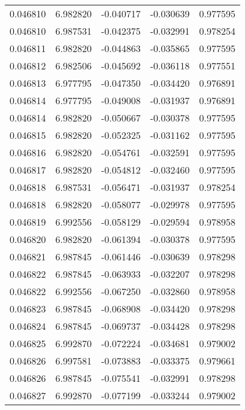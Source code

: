 \begin{tabular}{lrrrr}
0.046810    &  6.982820 & -0.040717 & -0.030639 &             0.977595 \\
0.046810    &  6.987531 & -0.042375 & -0.032991 &             0.978254 \\
0.046811    &  6.982820 & -0.044863 & -0.035865 &             0.977595 \\
0.046812    &  6.982506 & -0.045692 & -0.036118 &             0.977551 \\
0.046813    &  6.977795 & -0.047350 & -0.034420 &             0.976891 \\
0.046814    &  6.977795 & -0.049008 & -0.031937 &             0.976891 \\
0.046814    &  6.982820 & -0.050667 & -0.030378 &             0.977595 \\
0.046815    &  6.982820 & -0.052325 & -0.031162 &             0.977595 \\
0.046816    &  6.982820 & -0.054761 & -0.032591 &             0.977595 \\
0.046817    &  6.982820 & -0.054812 & -0.032460 &             0.977595 \\
0.046818    &  6.987531 & -0.056471 & -0.031937 &             0.978254 \\
0.046818    &  6.982820 & -0.058077 & -0.029978 &             0.977595 \\
0.046819    &  6.992556 & -0.058129 & -0.029594 &             0.978958 \\
0.046820    &  6.982820 & -0.061394 & -0.030378 &             0.977595 \\
0.046821    &  6.987845 & -0.061446 & -0.030639 &             0.978298 \\
0.046822    &  6.987845 & -0.063933 & -0.032207 &             0.978298 \\
0.046822    &  6.992556 & -0.067250 & -0.032860 &             0.978958 \\
0.046823    &  6.987845 & -0.068908 & -0.034420 &             0.978298 \\
0.046824    &  6.987845 & -0.069737 & -0.034428 &             0.978298 \\
0.046825    &  6.992870 & -0.072224 & -0.034681 &             0.979002 \\
0.046826    &  6.997581 & -0.073883 & -0.033375 &             0.979661 \\
0.046826    &  6.987845 & -0.075541 & -0.032991 &             0.978298 \\
0.046827    &  6.992870 & -0.077199 & -0.033244 &             0.979002 \\

\end{tabular}

